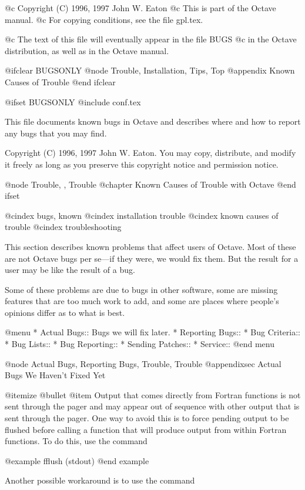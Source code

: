 @c Copyright (C) 1996, 1997 John W. Eaton
@c This is part of the Octave manual.
@c For copying conditions, see the file gpl.tex.

@c The text of this file will eventually appear in the file BUGS
@c in the Octave distribution, as well as in the Octave manual.

@ifclear BUGSONLY
@node Trouble, Installation, Tips, Top
@appendix Known Causes of Trouble
@end ifclear

@ifset BUGSONLY
@include conf.tex

This file documents known bugs in Octave and describes where and how to
report any bugs that you may find.

Copyright (C) 1996, 1997 John W. Eaton.  You may copy, distribute, and
modify it freely as long as you preserve this copyright notice and
permission notice.

@node Trouble,  , Trouble
@chapter Known Causes of Trouble with Octave
@end ifset

@cindex bugs, known
@cindex installation trouble
@cindex known causes of trouble
@cindex troubleshooting

This section describes known problems that affect users of Octave.  Most
of these are not Octave bugs per se---if they were, we would fix them.
But the result for a user may be like the result of a bug.

Some of these problems are due to bugs in other software, some are
missing features that are too much work to add, and some are places
where people's opinions differ as to what is best.

@menu
* Actual Bugs::                 Bugs we will fix later.
* Reporting Bugs::              
* Bug Criteria::                
* Bug Lists::                   
* Bug Reporting::               
* Sending Patches::             
* Service::                     
@end menu

@node Actual Bugs, Reporting Bugs, Trouble, Trouble
@appendixsec Actual Bugs We Haven't Fixed Yet

@itemize @bullet
@item
Output that comes directly from Fortran functions is not sent through
the pager and may appear out of sequence with other output that is sent
through the pager.  One way to avoid this is to force pending output to
be flushed before calling a function that will produce output from
within Fortran functions.  To do this, use the command

@example
fflush (stdout)
@end example

Another possible workaround is to use the command

